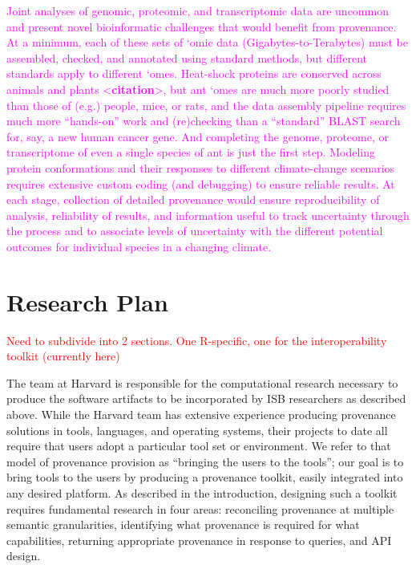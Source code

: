 \documentclass[10pt]{article}
\newcommand{\todo}[1]{\textcolor{red}{#1}}
\begin{document}
 \textcolor{magenta}{Joint analyses of genomic, proteomic, and
transcriptomic data are uncommon and present novel bioinformatic
challenges that would benefit from provenance. At a minimum, each of
these sets of `omic data (Gigabytes-to-Terabytes) must be assembled,
checked, and annotated using standard methods, but different standards
apply to different `omes. Heat-shock proteins are conserved across
animals and plants <\textbf{citation}>, but ant `omes are much more
poorly studied than those of (e.g.) people, mice, or rats, and the
data assembly pipeline requires much more ``hands-on'' work and
(re)checking than a ``standard'' BLAST search for, say, a new human
cancer gene. And completing the genome, proteome, or transcriptome of
even a single species of ant is just the first step. Modeling protein
conformations and their responses to different climate-change
scenarios requires extensive custom coding (and debugging) to ensure
reliable results. At each stage, collection of detailed provenance
would ensure reproducibility of analysis, reliability of results, and
information useful to track uncertainty through the process and to
associate levels of uncertainty with the different potential outcomes
for individual species in a changing climate.}

\section{Research Plan}

\todo{Need to subdivide into 2 sections.  One R-specific, 
one for the interoperability toolkit (currently here)}

The team at Harvard is responsible for the computational research necessary
to produce the software artifacts to be incorporated by ISB researchers
as described above.
While the Harvard team has extensive experience producing provenance
solutions in tools, languages, and operating systems, their projects to
date all require that users adopt a particular tool set or environment.
We refer to that model of provenance provision as ``bringing the users to
the tools''; our goal is to bring tools to the users by
producing a provenance toolkit, easily integrated into any desired platform.
As described in the introduction, designing such a toolkit requires
fundamental research in four areas: reconciling provenance at multiple
semantic granularities, identifying what provenance is required for
what capabilities, returning appropriate provenance in response to
queries, and API design.
\end{document}
